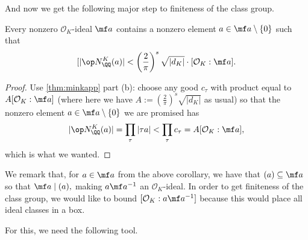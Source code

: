 \documentclass[../notes.tex]{subfiles}
\begin{document}
And now we get the following major step to finiteness of the class group.
\begin{corollary}
    Every nonzero $\mathcal O_K$-ideal $\mf a$ contains a nonzero element $a\in\mf a\setminus\{0\}$ such that
    \[[|\op N_\QQ^K(a)|<\left(\frac2\pi\right)^s\sqrt{|d_K|}\cdot[\mathcal O_K:\mf a].\]
\end{corollary}
\begin{proof}
    Use \autoref{thm:minkapp} part (b): choose any good $c_\tau$ with product equal to $A[\mathcal O_K:\mf a]$ (where here we have $A:=\left(\frac2\pi\right)^s\sqrt{|d_K|}$ as usual) so that the nonzero element $a\in\mf a\setminus\{0\}$ we are promised has
    \[|\op N_\QQ^K(a)|=\prod_\tau|\tau a|<\prod_\tau c_\tau=A[\mathcal O_K:\mf a],\]
    which is what we wanted.
\end{proof}
We remark that, for $a\in\mf a$ from the above corollary, we have that $(a)\subseteq\mf a$ so that $\mf a\mid(a),$ making $a\mf a^{-1}$ an $\mathcal O_K$-ideal. In order to get finiteness of the class group, we would like to bound $[\mathcal O_K:a\mf a^{-1}]$ because this would place all ideal classes in a box.

For this, we need the following tool.
\end{document}
